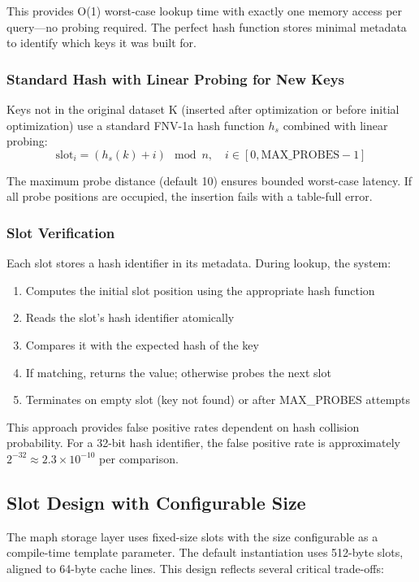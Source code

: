 \documentclass[10pt,conference]{IEEEtran}
\begin{document}
This provides O(1) worst-case lookup time with exactly one memory access per query—no probing required. The perfect hash function stores minimal metadata to identify which keys it was built for.

\subsubsection{Standard Hash with Linear Probing for New Keys}
Keys not in the original dataset K (inserted after optimization or before initial optimization) use a standard FNV-1a hash function $h_s$ combined with linear probing:
\begin{equation}
\text{slot}_i = (h_s(k) + i) \mod n, \quad i \in [0, \text{MAX\_PROBES}-1]
\end{equation}

The maximum probe distance (default 10) ensures bounded worst-case latency. If all probe positions are occupied, the insertion fails with a table-full error.

\subsubsection{Slot Verification}
Each slot stores a hash identifier in its metadata. During lookup, the system:
\begin{enumerate}
\item Computes the initial slot position using the appropriate hash function
\item Reads the slot's hash identifier atomically
\item Compares it with the expected hash of the key
\item If matching, returns the value; otherwise probes the next slot
\item Terminates on empty slot (key not found) or after MAX\_PROBES attempts
\end{enumerate}

This approach provides false positive rates dependent on hash collision probability. For a 32-bit hash identifier, the false positive rate is approximately $2^{-32} \approx 2.3 \times 10^{-10}$ per comparison.

\subsection{Slot Design with Configurable Size}

The maph storage layer uses fixed-size slots with the size configurable as a compile-time template parameter. The default instantiation uses 512-byte slots, aligned to 64-byte cache lines. This design reflects several critical trade-offs:
\end{document}
